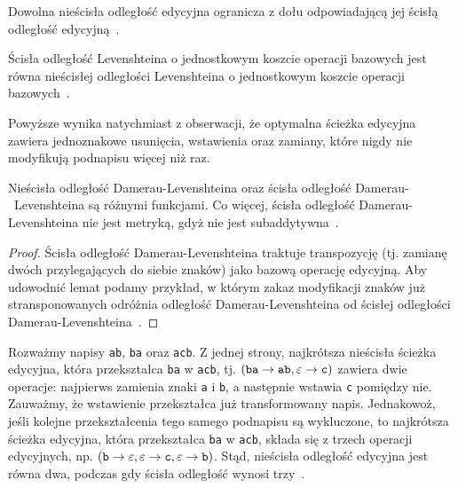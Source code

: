 \documentclass{praca1}
\begin{document}
\begin{lemma}
Dowolna nieścisła odległość edycyjna ogranicza z dołu odpowiadającą jej ścisłą odległość edycyjną~\cite{Boytsov2011:indexingmethods}.
\end{lemma}

\begin{lemma}
\label{lem:001}
Ścisła odległość Levenshteina o jednostkowym koszcie operacji bazowych jest równa nieścisłej odległości Levenshteina o jednostkowym koszcie operacji bazowych~\cite{Boytsov2011:indexingmethods}.
\end{lemma}

Powyższe wynika natychmiast z obserwacji, że optymalna ścieżka edycyjna zawiera jednoznakowe usunięcia, wstawienia oraz zamiany, które nigdy nie modyfikują podnapisu więcej niż raz.

\begin{lemma}
Nieścisła odległość Damerau-Levenshteina oraz ścisła odległość Damerau-~Levenshteina są różnymi funkcjami. Co więcej, ścisła odległość Damerau-Levenshteina nie jest metryką, gdyż nie jest subaddytywna~\cite{Boytsov2011:indexingmethods}.
\end{lemma}

\begin{proof}
Ścisła odległość Damerau-Levenshteina traktuje transpozycję (tj. zamianę dwóch przylegających do siebie znaków) jako bazową operację edycyjną. Aby udowodnić lemat podamy przykład, w którym zakaz modyfikacji znaków już stransponowanych odróżnia odległość Damerau-Levenshteina od ścisłej odległości Damerau-Levenshteina~\cite{Boytsov2011:indexingmethods}.
\end{proof}

Rozważmy napisy \verb|ab|, \verb|ba| oraz \verb|acb|. Z jednej strony, najkrótsza nieścisła ścieżka edycyjna, która przekształca \verb|ba| w \verb|acb|, tj. $(\verb|ba| \rightarrow \verb|ab|, \varepsilon \rightarrow \verb|c|)$ zawiera dwie operacje: najpierws zamienia znaki \verb|a| i \verb|b|, a następnie wstawia \verb|c| pomiędzy nie. Zauważmy, że wstawienie przekształca już transformowany napis. Jednakowoż, jeśli kolejne przekształcenia tego samego podnapisu są wykluczone, to najkrótsza ścieżka edycyjna, która przekształca \verb|ba| w \verb|acb|, składa się z trzech operacji edycyjnych, np. $(\verb|b| \rightarrow \varepsilon, \varepsilon \rightarrow \verb|c|, \varepsilon \rightarrow \verb|b|)$. Stąd, nieścisła odległość edycyjna jest równa dwa, podczas gdy ścisła odległość wynosi trzy~\cite{Boytsov2011:indexingmethods}. 
\end{document}
